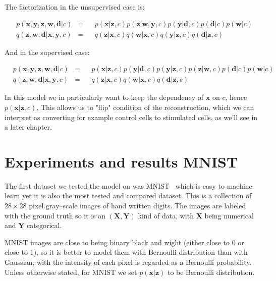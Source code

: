 \documentclass[11pt, a4paper]{report}
\theoremstyle{plain}
\theoremstyle{definition}
\theoremstyle{remark}
\newcommand{\X}{\mathbf{X}}
\newcommand{\x}{\mathbf{x}}
\newcommand{\z}{\mathbf{z}}
\newcommand{\Y}{\mathbf{Y}}
\newcommand{\y}{\mathbf{y}}
\newcommand{\w}{\mathbf{w}}
\newcommand{\dd}{\mathbf{d}}
\begin{document}
The factorization in the unsupervised case is:

\begin{equation}
\begin{aligned}
&p(\x, \y, \z, \w, \dd | c) &=& 
&p(\x | \z, c) p(\z | \w, \y, c) p(\y | \dd, c) p(\dd | c) p(\w | c) \\
&q(\z, \w, \dd | \x, \y, c) &=& 
&q(\z | \x, c) q(\w | \x, c) q(\y | \z, c) q(\dd | \z, c)
\label{eq:cgmmfact_unsupervised.}
\end{aligned}
\end{equation}

And in the supervised case:

\begin{equation}
\begin{aligned}
&p(\x, \y, \z, \w, \dd | c) &=& 
&p(\x | \z, c) p(\y | \dd, c) p(\y | \z, c) p(\z | \w, c) p(\dd | c) p(\w | c) \\
&q(\z, \w, \dd | \x, \y, c) &=& 
&q(\z | \x, c) q(\w | \x, c) q(\dd | \z, c)
\label{eq:cgmmfact_supervised}
\end{aligned}
\end{equation}

In this model we in particularly want to keep the dependency of $\x$ on $c$, hence
$p(\x | \z, c)$. This allows us to "flip" condition of the reconstruction,
which we can interpret as converting for example control cells to stimulated
cells, as we'll see in a later chapter.

\chapter{Experiments and results MNIST}

The first dataset we tested the model on was MNIST~\cite{mnist} which is 
easy to machine learn yet it is also the most tested and compared dataset.
This is a collection of $28 \times 28$ pixel gray--scale images of hand written 
digits. The images are labeled with the ground truth so it is an $(\X,\Y)$ kind
of data, with $\X$ being numerical and $\Y$ categorical.

MNIST images are close to being binary black and wight (either close to $0$ or
close to $1$), so it is better to model them with Bernoulli distribution than
with Gaussian, with the intensity of each pixel is regarded as a Bernoulli
probability.
Unless otherwise stated, for MNIST we set $p(\x | \z)$ to be Bernoulli
distribution.
\end{document}
